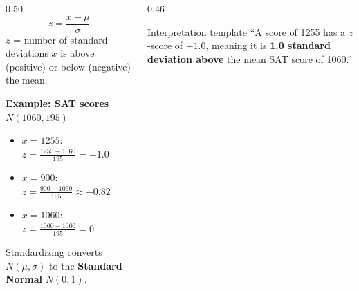 \documentclass[aspectratio=169, 11pt]{beamer}
\begin{document}
{
\begin{frame}[t, plain]
  \vspace{0.45cm}\par
  \hspace{0.55cm}%
  \begin{minipage}{0.9\textwidth}


    \begin{columns}[T]
      \begin{column}{0.50\textwidth}
        \small
        \[
          z = \dfrac{x - \mu}{\sigma}
        \]
        $z$ = number of standard deviations $x$ is above (positive)
        or below (negative) the mean.

        \vspace{0.5em}
        \textbf{Example: SAT scores $N(1060, 195)$}
        \begin{itemize}
          \setlength{\itemsep}{0.4em}
          \item $x = 1255$: $z = \frac{1255-1060}{195} = +1.0$
          \item $x = 900$: $z = \frac{900-1060}{195} \approx -0.82$
          \item $x = 1060$: $z = \frac{1060-1060}{195} = 0$
        \end{itemize}

        \vspace{0.5em}
        Standardizing converts $N(\mu, \sigma)$ to the
        \textbf{Standard Normal} $N(0, 1)$.
      \end{column}
      \begin{column}{0.46\textwidth}
        \begin{block}{Interpretation template}
          \small
          ``A score of 1255 has a $z$-score of $+1.0$,
          meaning it is \textbf{1.0 standard deviation above}
          the mean SAT score of 1060.''
        \end{block}


\end{column}
\end{columns}
\end{minipage}
\end{frame}}
\end{document}
